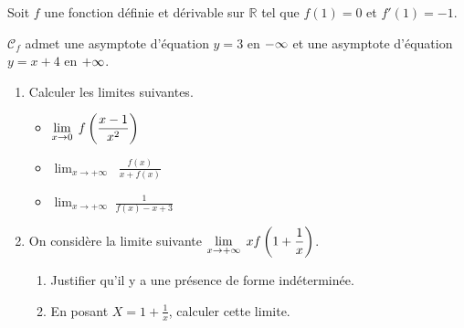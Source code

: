 \begin{exercice}

 Soit $ f $ une  fonction  définie et dérivable sur\;  $\mathbb{R} $ \;  tel que $ f(1)=0 $ \;  et  \; $ f'(1)=-1 $.
 

 
  $ \mathcal{C}_{f} $ admet  une asymptote d'équation $ y=3 $  en $ -\infty $  et une asymptote d'équation $ y=x+4 $  en $ +\infty $.

\begin{enumerate}
\item Calculer les limites suivantes.

\begin{itemize}
\item $\displaystyle \lim_{x \to 0}\; f\left(\frac{x-1}{x^2}\right)$
\item $ \displaystyle\lim_{x \to +\infty}\;\;\frac{f(x)}{ x+f(x)}$
\item $\displaystyle \lim_{x \to +\infty}\; \frac{1}{f(x)-x+3}$
\end{itemize}


\item On considère  la limite  suivante  $ \displaystyle\lim_{x \to +\infty}\; xf\left(1+\frac{1}{x}\right)$.
\begin{enumerate}
\item Justifier qu'il y a une présence de forme indéterminée.
\item En posant $ X=1+\frac{1}{x} $,   calculer cette limite.
\end{enumerate}
\end{enumerate}


\end{exercice}

